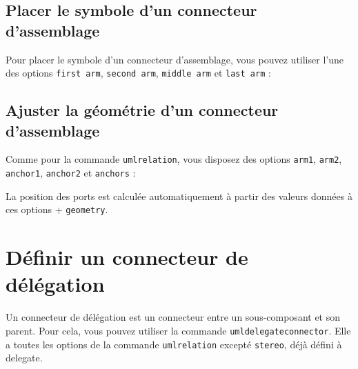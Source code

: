 \documentclass[a4paper,11pt]{report}
\newcommand{\inputTikZ}[1]{%
  }%
\newcommand{\inputTikZ}[1]{%
    \texttt{[image: fig/\#1.pdf]}%
  }%
\begin{document}
\subsection{Placer le symbole d'un connecteur d'assemblage}

Pour placer le symbole d'un connecteur d'assemblage, vous pouvez utiliser l'une des options {\tt first arm}, {\tt second arm}, {\tt middle arm} et {\tt last arm} :

\medskip

\begin{minipage}{0.45\textwidth}

\end{minipage}
\begin{minipage}{0.55\textwidth}
\begin{center}
\inputTikZ{componentassemblyconnectorarm}
\end{center}
\end{minipage}

\subsection{Ajuster la géométrie d'un connecteur d'assemblage}

Comme pour la commande {\tt umlrelation}, vous disposez des options {\tt arm1}, {\tt arm2}, {\tt anchor1}, {\tt anchor2} et {\tt anchors} :

\medskip

\begin{minipage}{0.45\textwidth}

\end{minipage}
\begin{minipage}{0.55\textwidth}
\begin{center}
\inputTikZ{componentassemblyconnectoradjust}
\end{center}
\end{minipage}

\medskip

La position des ports est calculée automatiquement à partir des valeurs données à ces options + {\tt geometry}.

\section{Définir un connecteur de délégation}

Un connecteur de délégation est un connecteur entre un sous-composant et son parent. Pour cela, vous pouvez utiliser la commande {\tt umldelegateconnector}. Elle a toutes les options de la commande {\tt umlrelation} excepté {\tt stereo}, déjà défini à delegate.
\end{document}
